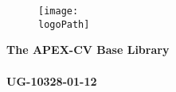 \documentclass[oneside]{book}
\newcommand{\docTitleLineOne}{The APEX-CV Base Library}    %
\newcommand{\docTitleLineTwo}{}          %
\newcommand{\docID}{UG-10328-01-12}      %
\newcommand{\logoPath}{../../../../../script/doxygen/NXP_logo_RGB_512x960.pdf}   %
\newcommand{\+}{\discretionary{\mbox{\scriptsize$\hookleftarrow$}}{}{}}
\begin{document}
\pagestyle{empty} %

\begin{figure}
	\centering
	\texttt{[image: \\logoPath]}
\end{figure}

\vspace*{2.5cm}
\begin{flushright}
	\Huge
	\textbf{ \docTitleLineOne} \vspace*{0.4cm} \\ 
	\textbf{ \docTitleLineTwo} \\
	\huge
	\vspace*{2.0cm}
	\textbf{\docID}
\end{flushright}
\vspace*{2.4cm}
\end{document}
